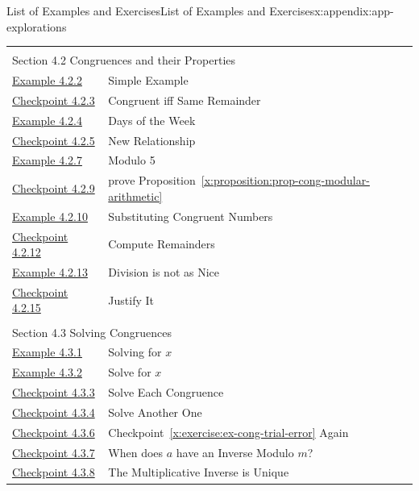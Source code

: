 \documentclass[oneside,10pt,]{book}
\newcommand{\xreffont}{\relax}
\numberwithin{equation}{section}
\begin{document}
\begin{appendixptx}{List of Examples and Exercises}{}{List of Examples and Exercises}{}{}{x:appendix:app-explorations}
\begin{longtable}[l]{ll}
\multicolumn{2}{l}{\null}\\[1.5ex] \multicolumn{2}{l}{\large Section 4.2 Congruences and their Properties}\\[0.5ex]
\hyperref[x:example:eg-cong-example]{Example 4.2.2}& Simple Example\\
\hyperref[x:exercise:ex-cong-remainder]{Checkpoint 4.2.3}& Congruent iff Same Remainder\\
\hyperref[x:example:eg-cong-week]{Example 4.2.4}& Days of the Week\\
\hyperref[x:exercise:eg-cong-week-2]{Checkpoint 4.2.5}& New Relationship\\
\hyperref[x:example:eg-cong-mod5]{Example 4.2.7}& Modulo 5\\
\hyperref[x:exercise:ex-cong-prove-modular-arithmetic]{Checkpoint 4.2.9}& prove Proposition~{\xreffont\ref*{x:proposition:prop-cong-modular-arithmetic}}\\
\hyperref[x:example:eg-cong-modular-arithmetic]{Example 4.2.10}& Substituting Congruent Numbers\\
\hyperref[x:exercise:ex-cong-compute-remainder]{Checkpoint 4.2.12}& Compute Remainders\\
\hyperref[x:example:eg-cong-dividing-doesnt-work]{Example 4.2.13}& Division is not as Nice\\
\hyperref[x:exercise:ex-cong-division-explain]{Checkpoint 4.2.15}& Justify It\\
\multicolumn{2}{l}{\null}\\[1.5ex] \multicolumn{2}{l}{\large Section 4.3 Solving Congruences}\\[0.5ex]
\hyperref[x:example:eg-cong-solve-congruence]{Example 4.3.1}& Solving for \(x\)\\
\hyperref[x:example:eg-cong-solve-congruence-express]{Example 4.3.2}& Solve for \(x\)\\
\hyperref[x:exercise:ex-cong-solve-for-x]{Checkpoint 4.3.3}& Solve Each Congruence\\
\hyperref[x:exercise:ex-cong-trial-error]{Checkpoint 4.3.4}& Solve Another One\\
\hyperref[x:exercise:ex-cong-multiplicative-inverse]{Checkpoint 4.3.6}& Checkpoint~{\xreffont\ref*{x:exercise:ex-cong-trial-error}} Again\\
\hyperref[x:exercise:ex-cong-inverse-existence]{Checkpoint 4.3.7}& When does \(a\) have an Inverse Modulo \(m\)?\\
\hyperref[x:exercise:ex-cong-prove-inverse-unique]{Checkpoint 4.3.8}& The Multiplicative Inverse is Unique\\

\end{longtable}
\end{appendixptx}
\end{document}
